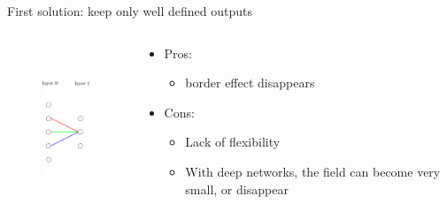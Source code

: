 \documentclass[xcolor=pdftex,dvipsnames,table,mathserif]{beamer}
\begin{document}
\begin{frame}{First solution: keep only well defined outputs}

\begin{columns}
  \begin{column}{.5\textwidth}
  \begin{figure}
    \includegraphics[height=5cm]{conv_border_effect2}
  \end{figure}

  \end{column}

  \begin{column}{.5\textwidth}
  \begin{itemize}
  \item Pros:
    \begin{itemize}
    \item border effect disappears
    \end{itemize}
  \item Cons:
    \begin{itemize}
    \item Lack of flexibility
    \item With deep networks, the field can become very small, or disappear
    \end{itemize}
  \end{itemize}

  \end{column}
\end{columns}



\end{frame}
\end{document}
